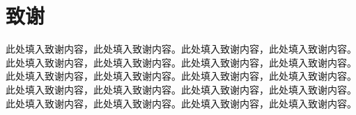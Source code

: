 \chapter*{致谢}
此处填入致谢内容，此处填入致谢内容。此处填入致谢内容，此处填入致谢内容。此处填入致谢内容，此处填入致谢内容。此处填入致谢内容，此处填入致谢内容。此处填入致谢内容，此处填入致谢内容。此处填入致谢内容，此处填入致谢内容。此处填入致谢内容，此处填入致谢内容。此处填入致谢内容，此处填入致谢内容。此处填入致谢内容，此处填入致谢内容。此处填入致谢内容，此处填入致谢内容。